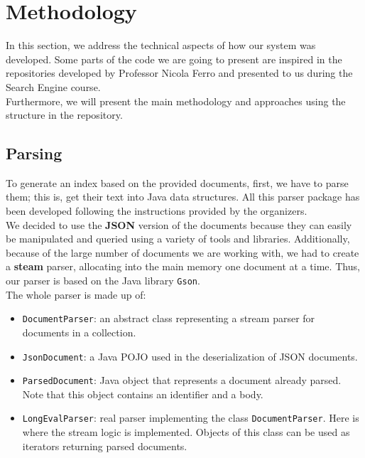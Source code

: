 \section{Methodology}\label{sec:methodology}
In this section, we address the technical aspects of how our system was developed.
Some parts of the code we are going to present are inspired in the repositories developed by Professor Nicola Ferro and
presented to us during the Search Engine course. \\
Furthermore, we will present the main methodology and approaches using the structure in the repository\cite{jihuming}.

\subsection{Parsing}\label{subsec:parsing}
To generate an index based on the provided documents, first, we have to parse them;
this is, get their text into Java data structures.
All this parser package has been developed following the instructions provided by the organizers.\\
We decided to use the \textbf{JSON} version of the documents because they can easily be manipulated and queried using a
variety of tools and libraries.
Additionally, because of the large number of documents we are working with, we had to create a \textbf{steam} parser,
allocating into the main memory one document at a time.
Thus, our parser is based on the Java library \texttt{Gson}.\\
The whole parser is made up of:
\begin{itemize}
    \item \texttt{DocumentParser}: an abstract class representing a stream parser for documents in a collection.
    \item \texttt{JsonDocument}: a Java POJO used in the deserialization of JSON documents.
    \item \texttt{ParsedDocument}: Java object that represents a document already parsed.
Note that this object contains an identifier and a body.
    \item \texttt{LongEvalParser}: real parser implementing the class \texttt{DocumentParser}.
Here is where the stream logic is implemented.
Objects of this class can be used as iterators returning parsed documents.
\end{itemize}

